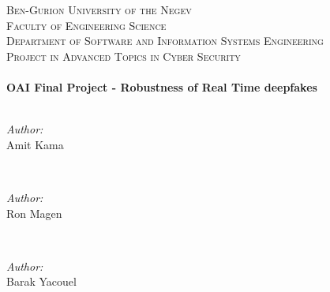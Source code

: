 \documentclass[english,12pt]{article}
\begin{document}
\begin{titlepage}
\textsc{\LARGE Ben-Gurion University of the Negev}\\[1.5cm] 

\textsc{\Large Faculty of Engineering Science}\\[0.5cm] 

\textsc{\large Department of Software and Information Systems
Engineering}\\[0.5cm] 

\textsc{\large Project in Advanced Topics in Cyber Security}\\[0.5cm] 



\HRule \\[0.4cm]
{ \huge \bfseries OAI Final Project - Robustness of Real Time deepfakes } \\[0.4cm] 
\HRule \\[1.5cm]
 

\begin{minipage}{0.4\textwidth}
\begin{flushleft} \large \emph{Author:}\\
Amit Kama %
\end{flushleft}
\end{minipage}
~
\begin{minipage}{0.4\textwidth}
\begin{flushright} \large \emph{Author:} \\
Ron Magen %
\end{flushright}
\end{minipage}\\[1cm]

\begin{minipage}{0.4\textwidth}
\begin{flushleft} \large \emph{Author:}\\
Barak Yacouel %
\end{flushleft}
\end{minipage}
~
\begin{minipage}{0.4\textwidth}
\begin{flushleft} \large \emph{ }\\
\end{flushleft}
\end{minipage}\\[2cm]
    

\end{titlepage}
\end{document}
